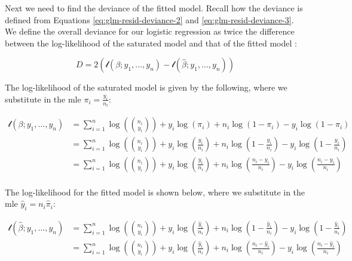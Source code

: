 \documentclass{report}
\begin{document}
Next we need to find the deviance of the fitted model. Recall how the deviance is defined from Equations \ref{eq:glm-resid-deviance-2} and \ref{eq:glm-resid-deviance-3}. We define the overall deviance for our logistic regression as twice the difference between the log-likelihood of the saturated model and that of the fitted model :

\begin{equation}\label{eq:ex-glm-2023q5-overall-deviance-1}
    D = 2 \left(\mathcal{l}(\beta; y_1, \dots, y_n) - \mathcal{l}\left(\hat{\beta}; y_1, \dots, y_n\right)\right)
\end{equation}

The log-likelihood of the saturated model is given by the following, where we substitute in the \gls{mle} $\pi_i = \frac{y_i}{n_i}$:

\begin{equation}\label{eq:ex-glm-2023-q5-saturated-model-log-likelihood}
    \begin{aligned}
        \mathcal{l}(\beta; y_1, \dots, y_n)
          &= \sum_{i=1}^n \log\left(\binom{n_i}{y_i}\right) + y_i\log(\pi_i) + n_i\log(1 - \pi_i) - y_i\log(1 - \pi_i) \\
          &= \sum_{i=1}^n \log\left(\binom{n_i}{y_i}\right) + y_i\log\left(\frac{y_i}{n_i}\right) + n_i \log\left(1 - \frac{y_i}{n_i}\right) - y_i \log\left(1 - \frac{y_i}{n_i}\right) \\
          &= \sum_{i=1}^n \log\left(\binom{n_i}{y_i}\right) + y_i\log\left(\frac{y_i}{n_i}\right) + n_i\log\left(\frac{n_i-y_i}{n_i}\right) - y_i\log\left(\frac{n_i-y_i}{n_i}\right) \\ 
    \end{aligned}
\end{equation}

The log-likelihood for the fitted model is shown below, where we substitute in the \gls{mle} $\hat{y}_i = n_i\hat{\pi}_i$:

\begin{equation}\label{eq:ex-glm-2023-q5-fitted-model-log-likelihood}
    \begin{aligned}
        \mathcal{l}\left(\hat{\beta}; y_1, \dots, y_n\right)
          &= \sum_{i=1}^n \log\left(\binom{n_i}{y_i}\right) + y_i\log\left(\frac{\hat{y}_i}{n_i}\right) + n_i\log\left(1 - \frac{\hat{y}_i}{n_i}\right) - y_i\log\left(1 - \frac{\hat{y}_i}{n_i}\right) \\
          &= \sum_{i=1}^n \log\left(\binom{n_i}{y_i}\right) + y_i\log\left(\frac{\hat{y}_i}{n_i}\right) + n_i\log\left(\frac{n_i - \hat{y}_i}{n_i}\right) - y_i\log\left(\frac{n_i - \hat{y}_i}{n_i}\right) \\
    \end{aligned}
\end{equation}
\end{document}
